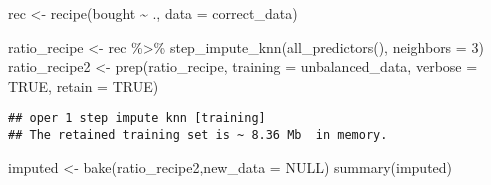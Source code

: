\documentclass[
]{book}
\newenvironment{Shaded}{\begin{snugshade}}{\end{snugshade}}
\newcommand{\AttributeTok}[1]{\textcolor[rgb]{0.77,0.63,0.00}{#1}}
\newcommand{\ConstantTok}[1]{\textcolor[rgb]{0.00,0.00,0.00}{#1}}
\newcommand{\DecValTok}[1]{\textcolor[rgb]{0.00,0.00,0.81}{#1}}
\newcommand{\FunctionTok}[1]{\textcolor[rgb]{0.00,0.00,0.00}{#1}}
\newcommand{\NormalTok}[1]{#1}
\newcommand{\OtherTok}[1]{\textcolor[rgb]{0.56,0.35,0.01}{#1}}
\newcommand{\SpecialCharTok}[1]{\textcolor[rgb]{0.00,0.00,0.00}{#1}}
\begin{document}
\begin{Shaded}
\begin{Highlighting}[]
\NormalTok{rec }\OtherTok{\textless{}{-}} \FunctionTok{recipe}\NormalTok{(bought }\SpecialCharTok{\textasciitilde{}}\NormalTok{ ., }\AttributeTok{data =}\NormalTok{ correct\_data)}

\NormalTok{ratio\_recipe }\OtherTok{\textless{}{-}}\NormalTok{ rec }\SpecialCharTok{\%\textgreater{}\%} 
  \FunctionTok{step\_impute\_knn}\NormalTok{(}\FunctionTok{all\_predictors}\NormalTok{(), }\AttributeTok{neighbors =} \DecValTok{3}\NormalTok{)}
\NormalTok{ratio\_recipe2 }\OtherTok{\textless{}{-}} \FunctionTok{prep}\NormalTok{(ratio\_recipe, }\AttributeTok{training =}\NormalTok{ unbalanced\_data, }\AttributeTok{verbose =} \ConstantTok{TRUE}\NormalTok{, }\AttributeTok{retain =} \ConstantTok{TRUE}\NormalTok{)}
\end{Highlighting}
\end{Shaded}

\begin{verbatim}
## oper 1 step impute knn [training] 
## The retained training set is ~ 8.36 Mb  in memory.
\end{verbatim}

\begin{Shaded}
\begin{Highlighting}[]
\NormalTok{imputed }\OtherTok{\textless{}{-}} \FunctionTok{bake}\NormalTok{(ratio\_recipe2,}\AttributeTok{new\_data =} \ConstantTok{NULL}\NormalTok{)}
\FunctionTok{summary}\NormalTok{(imputed)}
\end{Highlighting}
\end{Shaded}
\end{document}
